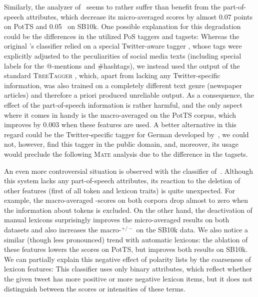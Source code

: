 Similarly, the analyzer of~\citet{Mohammad:13} seems to rather suffer
than benefit from the part-of-speech attributes, which decrease its
micro-averaged scores by almost 0.07 points on PotTS and 0.05~\F{} on
SB10k.  One possible explanation for this degradation could be the
differences in the utilized PoS taggers and tagsets: Whereas the
original \citeauthor{Mohammad:13}'s classifier relied on a special
Twitter-aware tagger \cite{Owoputi:13}, whose tags were explicitly
adjusted to the peculiarities of social media texts (including special
labels for the @-mentions and \#hashtags), we instead used the output
of the standard \textsc{TreeTagger} \cite{Schmid:95}, which, apart
from lacking any Twitter-specific information, was also trained on a
completely different text genre (newspaper articles) and therefore a
priori produced unreliable output.  As a consequence, the effect of
the part-of-speech information is rather harmful, and the only aspect
where it comes in handy is the macro-averaged \F{} on the PotTS
corpus, which improves by 0.003 when these features are used.  A
better alternative in this regard could be the Twitter-specific tagger
for German developed by~\citet{Rehbein:13}, we could not, however,
find this tagger in the public domain, and, moreover, its usage would
preclude the following \textsc{Mate} analysis due to the difference in
the tagsets.

An even more controversial situation is observed with the classifier
of~\citet{Guenther:14}. Although this system lacks any part-of-speech
attributes, its reaction to the deletion of other features (first of
all token and lexicon traits) is quite unexpected.  For example, the
macro-averaged \F{}-scores on both corpora drop almost to zero when
the information about tokens is excluded.  On the other hand, the
deactivation of manual lexicons surprisingly improves the
micro-averaged results on both datasets and also increases the
macro-\F{}$^{+/-}$ on the SB10k data.  We also notice a similar
(though less pronounced) trend with automatic lexicons: the ablation
of these features lowers the scores on PotTS, but improves both
results on SB10k.  We can partially explain this negative effect of
polarity lists by the coarseness of lexicon features: This classifier
uses only binary attributes, which reflect whether the given tweet has
more positive or more negative lexicon items, but it does not
distinguish between the scores or intensities of these terms.

